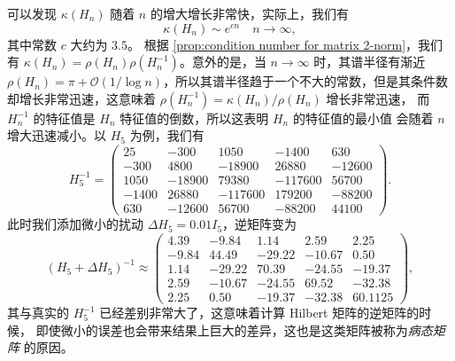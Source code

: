 \documentclass[fontset=none,zihao=-4]{Notes}
\begin{document}
\begin{example}[Hilbert 矩阵]
  可以发现 $\kappa(H_n)$ 随着 $n$ 的增大增长非常快，实际上，我们有
  \[
    \kappa(H_n)\sim e^{cn}\quad n\to\infty,
  \]
  其中常数 $c$ 大约为 $3.5$。
  根据 \autoref{prop:condition number for matrix 2-norm}，我们有
  $\kappa(H_n)=\rho(H_n)\rho(H_n^{-1})$。意外的是，当 $n\to\infty$ 时，其谱半径有渐近
  $\rho(H_n)=\pi+\mathcal{O}(1/\log n)$，所以其谱半径趋于一个不大的常数，但是其条件数
  却增长非常迅速，这意味着 $\rho(H_n^{-1})=\kappa(H_n)/\rho(H_n)$ 增长非常迅速，
  而 $H_n^{-1}$ 的特征值是 $H_n$ 特征值的倒数，所以这表明 $H_n$ 的特征值的最小值
  会随着 $n$ 增大迅速减小。以 $H_5$ 为例，我们有
  \[
    H_5^{-1}=\begin{pmatrix}
      25 & -300 & 1050 & -1400 & 630 \\
      -300 & 4800 & -18900 & 26880 & -12600 \\
      1050 & -18900& 79380& -117600& 56700 \\
      -1400& 26880&-117600& 179200& -88200 \\
      630& -12600& 56700& -88200& 44100
    \end{pmatrix}  .
  \]
  此时我们添加微小的扰动 $\Delta H_5=0.01 I_5$，逆矩阵变为 
  \[
    (H_5+\Delta H_5)^{-1}\approx\begin{pmatrix}
      4.39 & -9.84& 1.14& 2.59& 2.25 \\
      -9.84& 44.49& -29.22& -10.67& 0.50\\
      1.14& -29.22& 70.39& -24.55& -19.37\\
      2.59& -10.67& -24.55& 69.52& -32.38\\
      2.25& 0.50& -19.37& -32.38& 60.1125
    \end{pmatrix},
  \]
  其与真实的 $H_5^{-1}$ 已经差别非常大了，这意味着计算 Hilbert 矩阵的逆矩阵的时候，
  即使微小的误差也会带来结果上巨大的差异，这也是这类矩阵被称为\emph{病态矩阵}
  的原因。
\end{example}
\end{document}
